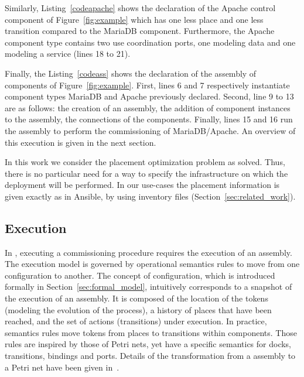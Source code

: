 

Similarly, Listing~\ref{codeapache} shows the declaration of the Apache control component of Figure~\ref{fig:example} which has one less place and one less transition compared to the MariaDB component. Furthermore, the Apache component type contains two use coordination ports, one modeling data and one modeling a service (lines 18 to 21).



Finally, the Listing~\ref{codeass} shows the declaration of the assembly of components of Figure~\ref{fig:example}. First, lines 6 and 7 respectively instantiate component types MariaDB and Apache previously declared. Second, line 9 to 13 are as follows: the creation of an assembly, the addition of component instances to the assembly, the connections of the components. Finally, lines 15 and 16 run the assembly to perform the commissioning of MariaDB/Apache. An overview of this execution is given in the next section.



In this work we consider the placement optimization problem as solved. Thus, there is no particular need for a way to specify the infrastructure on which the deployment will be performed. In our use-cases the placement information is given exactly as in Ansible, \ie by using inventory files (Section~\ref{sec:related_work}).

\subsection{Execution}

In \mad, executing a commissioning procedure requires the execution of an assembly. The \mad execution model is governed by operational semantics rules to move from one configuration to another. The concept of configuration, which is introduced formally in Section~\ref{sec:formal_model}, intuitively corresponds to a snapshot of the execution of an assembly. It is composed of the location of the tokens (modeling the evolution of the process), a history of places that have been reached, and the set of actions (transitions) under execution. In practice, semantics rules move tokens from places to transitions within components. Those rules are inspired by those of Petri nets, yet have a specific semantics for docks, transitions, bindings and ports. Details of the transformation from a \mad assembly to a Petri net have been given in~\cite{coullon:hal-02323641}.

